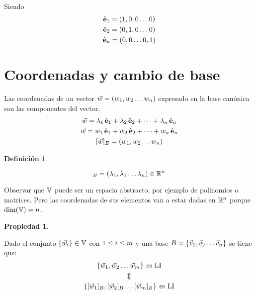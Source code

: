 \documentclass[a5paper,12pt,twoside]{book}
\newtheorem{defn}{{Definición}}[chapter]
\newtheorem{prop}{{Propiedad}}[chapter]
\begin{document}
Siendo
\begin{gather*}
    \hat{\textbf{e}}_1 = (1,0,0 \dots 0)
    \\
    \hat{\textbf{e}}_2 = (0,1,0 \dots 0)
    \\
    \hat{\textbf{e}}_n = (0,0 \dots 0,1)
\end{gather*}


\section{Coordenadas y cambio de base}

Las coordenadas de un vector $\Vec{w}=(w_1,w_2 \dots w_n)$ expresado en la base canónica son las componentes del vector.
\begin{gather*}
    \Vec{w} = \lambda_1 \, \hat{\textbf{e}}_1 + \lambda_2 \, \hat{\textbf{e}}_2 + \dots + \lambda_n \, \hat{\textbf{e}}_n
    \\
    \Vec{w} = w_1 \, \hat{\textbf{e}}_1 + w_2 \, \hat{\textbf{e}}_2 + \dots + w_n \, \hat{\textbf{e}}_n
    \\
    [\Vec{w}]_E = (w_1,w_2 \dots w_n)
\end{gather*}

\begin{mdframed}[style=MyFrame1]
    \begin{defn}
    \end{defn}
    \begin{equation*}
        [\Vec{w}]_B = (\lambda_1,\lambda_1 \dots \lambda_\nth) \in \setR^\nth
    \end{equation*}
\end{mdframed}

Observar que $\mathbb{V}$ puede ser un espacio abstracto, por ejemplo de polinomios o matrices. Pero las coordenadas de sus elementos van a estar dadas en $\mathbb{R}^n$ porque $\operatorname{dim}(\mathbb{V})=n$.

\begin{mdframed}[style=MyFrame1]
    \begin{prop}
    \end{prop}
    Dado el conjunto ${ \left\{ {\Vec{w}_i} \right\} } \in \mathbb{V}$ con $1\leq i\leq m$ y una base $B={ \left\{ {\Vec{v}_1,\Vec{v}_2 \dots \Vec{v}_n} \right\} }$ se tiene que:
    \begin{gather*}
        { \left\{ {\Vec{w}_1,\Vec{w}_2 \dots \Vec{w}_m} \right\} } \hspace{1ex} \textrm{es LI}
        \\
        \Updownarrow
        \\
        { \left\{ {[\Vec{w}_1]_B , [\Vec{w}_2]_B \dots [\Vec{w}_m]_B} \right\} } \hspace{1ex} \textrm{es LI}
    \end{gather*}
\end{mdframed}
\end{document}
